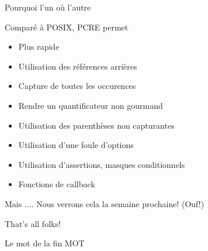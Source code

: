 \def\ftitle{Pourquoi l'un où l'autre}
\begin{frame}[containsverbatim]{\ftitle}
\def\blocktitle{Comparé à POSIX, PCRE permet}
\begin{block}{\blocktitle}
\begin{itemize}
\item     Plus rapide
\item     Utilisation des références arrières
\item     Capture de toutes les occurences
\item     Rendre un quantificateur non gourmand
\item     Utilisation des parenthèses non capturantes
\item     Utilisation d'une foule d'options
\item     Utilisation d'assertions, masques conditionnels
\item     Fonctions de callback
\end{itemize}
\end{block}

\def\blocktitle{Mais ....}
\begin{block}{\blocktitle}
Nous verrons cela la semaine prochaine! (Ouf!)
\end{block}

\end{frame}


\def\ftitle{That's all folks!}
\begin{frame}[containsverbatim]{\ftitle}
\def\blocktitle{Le mot de la fin}
\begin{block}{\blocktitle}
MOT
\end{block}
\end{frame}


